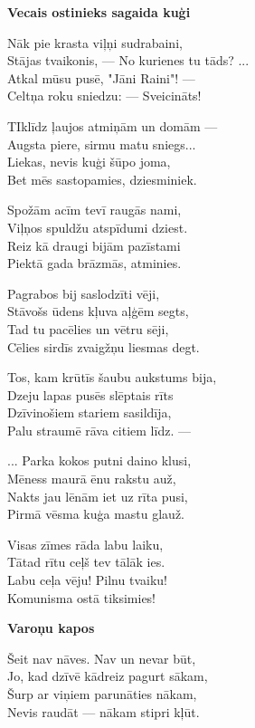 \documentclass[11pt]{article}
\begin{document}
\newpage

{\bf Vecais ostinieks sagaida kuģi}

Nāk pie krasta viļņi sudrabaini,\\
Stājas tvaikonis, --- No kurienes tu tāds? ...\\
Atkal mūsu pusē, "Jāni Raini"! ---\\
Celtņa roku sniedzu: --- Sveicināts!

TIklīdz ļaujos atmiņām un domām ---\\
Augsta piere, sirmu matu sniegs...\\
Liekas, nevis kuģi šūpo joma, \\
Bet mēs sastopamies, dziesminiek.

Spožām acīm tevī raugās nami,\\
Viļņos spuldžu atspīdumi dziest.\\
Reiz kā draugi bijām pazīstami\\
Piektā gada brāzmās, atminies.

Pagrabos bij saslodzīti vēji,\\
Stāvošs ūdens kļuva aļģēm segts,\\
Tad tu pacēlies un vētru sēji,\\
Cēlies sirdīs zvaigžņu liesmas degt.

Tos, kam krūtīs šaubu aukstums bija,\\
Dzeju lapas pusēs slēptais rīts\\
Dzīvinošiem stariem sasildīja,\\
Palu straumē rāva citiem līdz. ---

... Parka kokos putni daino klusi,\\
Mēness maurā ēnu rakstu auž,\\
Nakts jau lēnām iet uz rīta pusi,\\
Pirmā vēsma kuģa mastu glauž.

Visas zīmes rāda labu laiku,\\
Tātad rītu ceļš tev tālāk ies.\\
Labu ceļa vēju! Pilnu tvaiku!\\
Komunisma ostā tiksimies!

\newpage

{\bf Varoņu kapos}

Šeit nav nāves. Nav un nevar būt,\\
Jo, kad dzīvē kādreiz pagurt sākam,\\
Šurp ar viņiem parunāties nākam,\\
Nevis raudāt --- nākam stipri kļūt.
\end{document}
